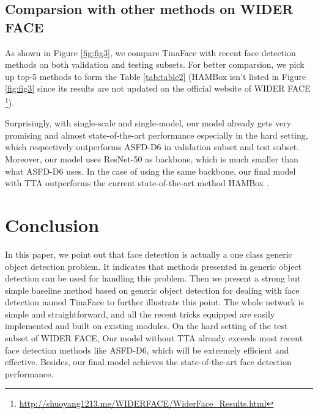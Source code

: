 \documentclass[final]{cvpr}
\begin{document}
\subsection{Comparsion with other methods on WIDER FACE}
As shown in Figure \ref{fig:fig3}, we compare TinaFace with recent face detection methods \cite{zhang2020asfd, zhang2020refineface, zhang2019accurate, deng2019retinaface, earp2019face, yashunin2020maskface, tian2018learning, li2019pyramidbox++, zhang2019improved, zhang2019robust, Liu_2019_CVPR, Li_2019_CVPR, yoo2019extd, chi2019selective, wang2017face, zhang2020feature, tang2018pyramidbox, zhang2019single, zhang2018face, wang2017detecting, Zhu_2018_CVPR, zhang2017s3fd, Najibi_2017_ICCV, wang2017facercnn, Hu_2017_CVPR, cai2016unified, yang2017face, zhu2017cms, zhang2016joint, ohn2016boost, yang2016wider, yang2015facial, yang2014aggregate} on both validation and testing subsets. For better comparsion, we pick up top-5 methods to form the Table \ref{tab:table2} (HAMBox \cite{Liu_2020_CVPR} isn't listed in Figure \ref{fig:fig3} since its results are not updated on the official website of WIDER FACE \footnote{\url{http://shuoyang1213.me/WIDERFACE/WiderFace_Results.html}}).

Surprisingly, with single-scale and single-model, our model already gets very promising and almost state-of-the-art performance especially in the hard setting, which respectively outperforms ASFD-D6 \cite{zhang2020asfd} in validation subset and test subset. Moreover, our model uses ResNet-50 as backbone, which is much smaller than what ASFD-D6 \cite{zhang2020asfd} uses. In the case of using the same backbone, our final model with TTA outperforms the current state-of-the-art method HAMBox \cite{Liu_2020_CVPR}.

\section{Conclusion}
In this paper, we point out that face detection is actually a one class generic object detection problem. It indicates that methods presented in generic object detection can be used for handling this problem. Then we present a strong but simple baseline method based on generic object detection for dealing with face detection named TinaFace to further  illustrate this point. The whole network is simple and straightforward, and all the recent tricks equipped are easily implemented and built on existing modules. On the hard setting of the test subset of WIDER FACE, Our model without TTA already exceeds most recent face detection methods like ASFD-D6, which will be extremely efficient and effective. Besides, our final model achieves the state-of-the-art face detection performance.

\printbibliography
\end{document}
